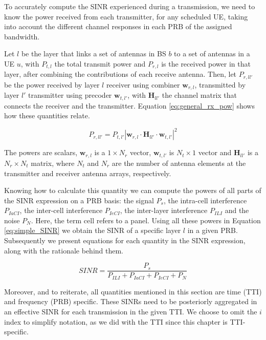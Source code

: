 To accurately compute the SINR experienced during a transmission, we need to 
know the power received from each transmitter, for any scheduled \acs{UE}, taking into account the different channel responses in each \acs{PRB} of the assigned bandwidth.

Let $l$ be the layer that links a set of antennas in BS $b$ to a set of antennas in a UE $u$, with $P_{t, l}$ the total transmit power and $P_{r, l}$ is the received power in that layer, after combining the contributions of each receive antenna. Then, let $P_{r, ll'}$ be the power received by layer $l$ receiver using combiner $\bm{w}_{r, l}$, transmitted by layer $l'$ transmitter using precoder $\bm{w}_{t, l'}$, with $\bm{H}_{ll'}$ the channel matrix that connects the receiver and the transmitter. Equation \eqref{eq:general_rx_pow} shows how these quantities relate.

\begin{equation} \label{eq:general_rx_pow}
    P_{r, ll'} = P_{t, l'} \left| \bm{w}_{r, l} \cdot \bm{H}_{ll'} \cdot \bm{w}_{t, l'} \right|^2        
\end{equation}

The powers are scalars, $\bm{w}_{r, l}$ is a $1 \times N_r$ vector, $\bm{w}_{t, l'}$ is $N_t \times 1$ vector and $\bm{H}_{ll'}$ is a $N_r \times N_t$ matrix, where $N_t$ and $N_r$ are the number of antenna elements at the transmitter and receiver antenna arrays, respectively.

Knowing how to calculate this quantity we can compute the powers of all parts of the SINR expression on a PRB basis: the signal $P_s$, the intra-cell interference $P_{IaCI}$, the inter-cell interference $P_{IeCI}$, the inter-layer interference $P_{ILI}$ and the noise $P_N$. Here, the term cell refers to a panel. Using all these powers in Equation \eqref{eq:simple_SINR} we obtain the SINR of a specific layer $l$ in a given PRB. Subsequently we present equations for each quantity in the SINR expression, along with the rationale behind them. 


\begin{equation} \label{eq:simple_SINR}
    SINR = \frac{P_s}{P_{ILI} + P_{IaCI} + P_{IeCI} + P_N}
\end{equation}

Moreover, and to reiterate, all quantities mentioned in this section are time (TTI) and frequency (PRB) specific. These SINRs need to be posteriorly aggregated in an effective SINR for each transmission in the given TTI. We choose to omit the $i$ index to simplify notation, as we did with the TTI since this chapter is TTI-specific.

